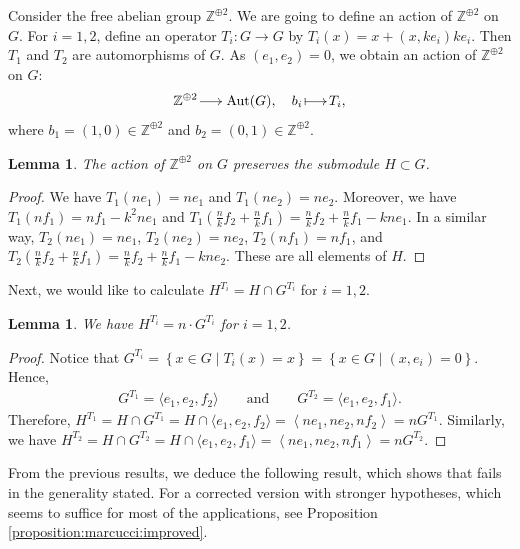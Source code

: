 \documentclass[a4paper,11pt,reqno]{amsart}
\makeatletter
\numberwithin{equation}{section}
\theoremstyle{plain}
\newtheorem{lemma}[theorem]{Lemma}
\theoremstyle{definition}
\newcommand{\Z}{\mathbb Z}
\newcommand{\Aut}{\operatorname{Aut}}
\renewcommand{\longrightarrow}{\xymatrix@1@=15pt{\ar[r]&}}
\renewcommand{\mapsto}{\xymatrix@1@=15pt{\ar@{|->}[r]&}}
\newcommand{\set}[1]{\left\{ #1 \right\}}
\makeatother
\begin{document}
Consider the free abelian group $\Z^{\oplus 2}$. We are going to define an action of $\Z^{\oplus 2}$ on $G$. For $i = 1,2$, define an operator $T_i \colon G \to G$ by $T_i(x) = x + (x, ke_i)ke_i$. 
Then $T_1$ and $T_2$ are automorphisms of $G$. As $(e_1, e_2) = 0$, we obtain an action of $\Z^{\oplus 2}$ on $G$:
\begin{align} \label{align:groupaction-marcucci}
\Z^{\oplus 2} \longrightarrow \Aut(G), \quad b_i \mapsto T_i,
\end{align}
where $b_1 = (1,0) \in \Z^{\oplus 2}$ and $b_2 = (0,1) \in \Z^{\oplus 2}$. 
\begin{lemma} \label{lemma:preserves}
The action of $\Z^{\oplus 2}$ on $G$ preserves the submodule $H \subset G$. 
\end{lemma}
\begin{proof}
We have $T_1(ne_1) = ne_1$ and $T_1(ne_2) = ne_2$. Moreover, we have $
    T_1(nf_1)= nf_1 - k^2 ne_1$ and $
    T_1\left( \frac{n}{k}f_2 + \frac{n}{k}f_1  \right) =
    \frac{n}{k}f_2 + \frac{n}{k}f_1 - kn e_1$. In a similar way, $T_2(ne_1) = ne_1$, $T_2(ne_2) = ne_2$, $ T_2(nf_1) = nf_1$, and $T_2\left( \frac{n}{k}f_2 + \frac{n}{k}f_1  \right) = 
    \frac{n}{k}f_2 + \frac{n}{k}f_1 - kn e_2$. 
These are all elements of $H$. 
\end{proof}
Next, we would like to calculate $H^{T_i} = H \cap G^{T_i}$ for $i = 1,2$.
\begin{lemma} \label{lemma:invariant-Ti-H}
    We have $H^{T_i} = n \cdot G^{T_i}$ for $i = 1,2$. 
\end{lemma}
\begin{proof}
Notice that 
$
G^{T_i} = \set{x \in G \mid T_i(x) = x} = \set{x \in G \mid (x,e_i) = 0}. 
$
Hence, \begin{align} \label{align:invariantGTi}
G^{T_1} = \langle e_1, e_2, f_2 \rangle \quad \quad \text{and}\quad \quad 
G^{T_2} = \langle e_1, e_2, f_1 \rangle.
\end{align}
Therefore, $H^{T_1} = H \cap G^{T_1} = H \cap \langle e_1, e_2, f_2 \rangle = \left \langle ne_1, ne_2, nf_2 \right \rangle = n G^{T_1}$. Similarly, we have $H^{T_2} = H \cap G^{T_2} = H \cap \langle e_1, e_2, f_1 \rangle= \left \langle ne_1, ne_2, nf_1 \right \rangle = nG^{T_2}$. 
\end{proof}

From the previous results, we deduce the following result, which shows that \cite[Proposition 3.6]{marcucci-genusofcurves} fails in the generality stated. For a corrected version with stronger hypotheses, which seems to suffice for most of the applications, see Proposition \ref{proposition:marcucci:improved}. 
\end{document}
